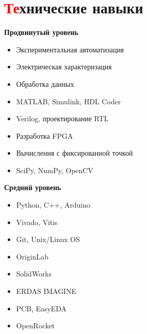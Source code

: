 \documentclass[a4paper, 10pt]{article}
\begin{document}
\section{\textcolor{red}{Те}хнические навыки}
\begin{center}
    \begin{minipage}[t]{0.45\textwidth}
        \textbf{Продвинутый уровень}
        \vspace{-7pt}
        \begin{itemize}
            \setlength{\itemindent}{0em}
            \setlength{\itemsep}{-3pt}
            \item Экспериментальная автоматизация
            \item Электрическая характеризация
            \item Обработка данных
            \item MATLAB, Simulink, HDL Coder
            \item Verilog, проектирование RTL
            \item Разработка FPGA
            \item Вычисления с фиксированной точкой
            \item SciPy, NumPy, OpenCV
        \end{itemize}
    \end{minipage}%
    \hfill
    \begin{minipage}[t]{0.45\textwidth}
        \textbf{Средний уровень}
        \vspace{-7pt}
        \begin{itemize}
            \setlength{\itemindent}{0em}
            \setlength{\itemsep}{-3pt}
            \item Python, C++, Arduino
            \item Vivado, Vitis
            \item Git, Unix/Linux OS
            \item OriginLab
            \item SolidWorks
            \item ERDAS IMAGINE
            \item PCB, EasyEDA
            \item OpenRocket
        \end{itemize}
    \end{minipage}
\end{center}
\vspace{-10pt}

\end{document}
